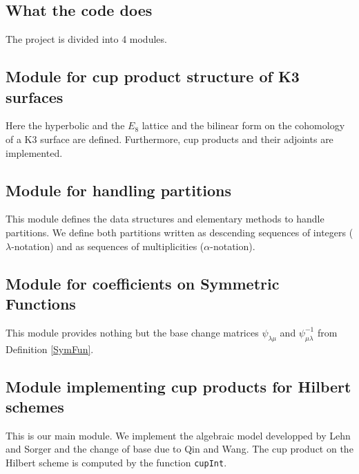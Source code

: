 \subsection{What the code does}
The project is divided into 4 modules.
\subsection{Module for cup product structure of K3 surfaces} 
Here the hyperbolic and the $E_8$ lattice and the bilinear form on the cohomology of a K3 surface are defined. Furthermore, cup products and their adjoints are implemented.

\subsection{Module for handling partitions} 
This module defines the data structures and elementary methods to handle partitions. We define both partitions written as descending sequences of integers ($\lambda$-notation) and as sequences of multiplicities ($\alpha$-notation).

\subsection{Module for coefficients on Symmetric Functions} 
This module provides nothing but the base change matrices $\psi_{\lambda\mu}$ and $\psi^{-1}_{\mu\lambda}$ from Definition \ref{SymFun}.
 
\subsection{Module implementing cup products for Hilbert schemes} This is our main module. We implement the algebraic model developped by Lehn and Sorger and the change of base due to Qin and Wang. The cup product on the Hilbert scheme is computed by the function \texttt{cupInt}.

 
